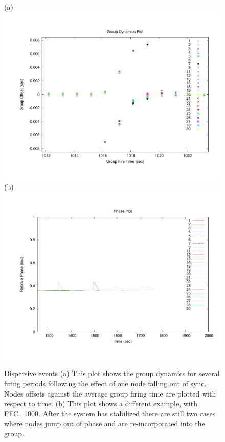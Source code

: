 \begin{figure}[t]
\begin{center}
(a)
\includegraphics[width=0.4\hsize]{./figures/GROUPDYNAMICS-SPECIFIC.pdf}
(b)
\includegraphics[width=0.4\hsize]{./figures/PHASEPLOT-SPECIFIC.pdf}
\end{center}
\caption{Dispersive events (a) This plot shows the group dynamics for
several firing periods following the effect of one node falling out of
sync. Nodes offsets against the average group firing time are plotted
with respect to time. (b) This plot shows a different example, with
FFC=1000. After the system has stabilized there are still two cases
where nodes jump out of phase and are re-incorporated into the group.}
\label{phaseplot-motelab-specific}
\end{figure}




